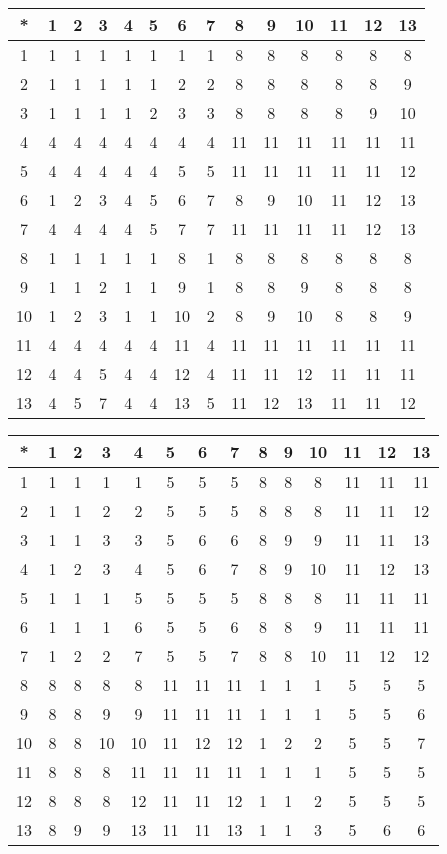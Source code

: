 \begin{tabular}[t]{c|ccccccccccccc}
*&1&2&3&4&5&6&7&8&9&10&11&12&13 \\ \hline
    1&1&1&1&1&1&1&1&8&8&8&8&8&8 \\
    2&1&1&1&1&1&2&2&8&8&8&8&8&9 \\
    3&1&1&1&1&2&3&3&8&8&8&8&9&10 \\
    4&4&4&4&4&4&4&4&11&11&11&11&11&11 \\
    5&4&4&4&4&4&5&5&11&11&11&11&11&12 \\
    6&1&2&3&4&5&6&7&8&9&10&11&12&13 \\
    7&4&4&4&4&5&7&7&11&11&11&11&12&13 \\
    8&1&1&1&1&1&8&1&8&8&8&8&8&8 \\
    9&1&1&2&1&1&9&1&8&8&9&8&8&8 \\
    10&1&2&3&1&1&10&2&8&9&10&8&8&9 \\
    11&4&4&4&4&4&11&4&11&11&11&11&11&11 \\
    12&4&4&5&4&4&12&4&11&11&12&11&11&11 \\
    13&4&5&7&4&4&13&5&11&12&13&11&11&12 
\end{tabular}


\begin{tabular}[t]{c|ccccccccccccc}
*&1&2&3&4&5&6&7&8&9&10&11&12&13 \\ \hline
    1&1&1&1&1&5&5&5&8&8&8&11&11&11 \\
    2&1&1&2&2&5&5&5&8&8&8&11&11&12 \\
    3&1&1&3&3&5&6&6&8&9&9&11&11&13 \\
    4&1&2&3&4&5&6&7&8&9&10&11&12&13 \\
    5&1&1&1&5&5&5&5&8&8&8&11&11&11 \\
    6&1&1&1&6&5&5&6&8&8&9&11&11&11 \\
    7&1&2&2&7&5&5&7&8&8&10&11&12&12 \\
    8&8&8&8&8&11&11&11&1&1&1&5&5&5 \\
    9&8&8&9&9&11&11&11&1&1&1&5&5&6 \\
    10&8&8&10&10&11&12&12&1&2&2&5&5&7 \\
    11&8&8&8&11&11&11&11&1&1&1&5&5&5 \\
    12&8&8&8&12&11&11&12&1&1&2&5&5&5 \\
    13&8&9&9&13&11&11&13&1&1&3&5&6&6 
\end{tabular}


